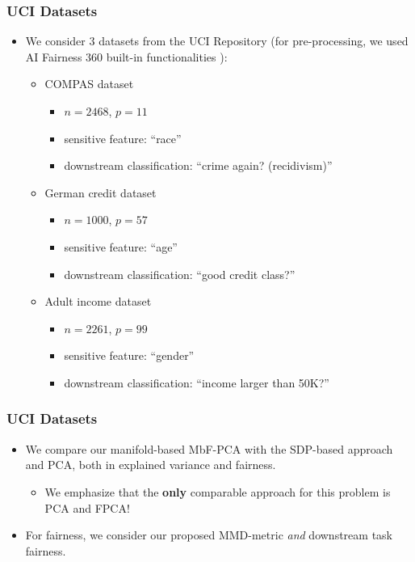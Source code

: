 \documentclass{beamer}
\begin{document}
\begin{frame}
	\frametitle{UCI Datasets}
	\begin{itemize}
		\item We consider $3$ datasets from the UCI Repository \cite{UCI} (for pre-processing, we used AI Fairness 360 built-in functionalities \cite{aif360}):
		\begin{itemize}
			\item COMPAS dataset \cite{angwin2016machine}
			\begin{itemize}
				\item $n = 2468$, $p = 11$
				\item sensitive feature: ``race''
				\item downstream classification: ``crime again? (recidivism)''
			\end{itemize}
			
			\item German credit dataset
			\begin{itemize}
				\item $n = 1000$, $p = 57$
				\item sensitive feature: ``age''
				\item downstream classification: ``good credit class?''
			\end{itemize}
			
			\item Adult income dataset
			\begin{itemize}
				\item $n = 2261$, $p = 99$
				\item sensitive feature: ``gender''
				\item downstream classification: ``income larger than 50K?''
			\end{itemize}
			
		\end{itemize}
	\end{itemize}
\end{frame}

\begin{frame}
	\frametitle{UCI Datasets}
	\begin{itemize}
		\item We compare our manifold-based MbF-PCA with the SDP-based approach and PCA, both in explained variance and fairness.
		\begin{itemize}
			\item We emphasize that the {\bf only} comparable approach for this problem is PCA and FPCA!
		\end{itemize}
	
		\item For fairness, we consider our proposed MMD-metric {\it and} downstream task fairness.
	\end{itemize}
\end{frame}
\end{document}
